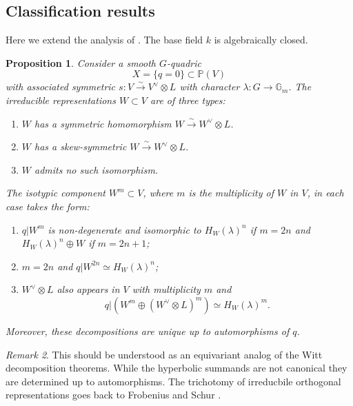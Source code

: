 \documentclass[12pt]{amsart}
\numberwithin{equation}{section}
\newcommand{\lra}{\longrightarrow}
\newcommand{\ra}{\rightarrow}
\newcommand{\bG}{\mathbb{G}}
\newcommand{\bP}{\mathbb{P}}
\theoremstyle{plain}
\newtheorem{prop}{Proposition}[section]
\theoremstyle{definition}
\theoremstyle{remark}
\newtheorem{rema}[prop]{Remark}
\begin{document}
\subsection*{Classification results}
Here we extend the analysis of \cite[\S 3]{HTEGLDQ}.
The base field $k$ is algebraically closed.  
\begin{prop} \label{prop:decomp}
Consider a smooth $G$-quadric
$$X=\{q=0 \} \subset \bP(V)$$
with associated symmetric
$s:V \stackrel{\sim}{\lra} V^{\vee} \otimes L$
with character $\lambda: G \ra \bG_m$.  
The irreducible representations $W \subset V$ are 
of three types:
\begin{enumerate}
\item{$W$ has a symmetric homomorphism
$W\stackrel{\sim}{\rightarrow} W^{\vee} \otimes L$.}
\item{$W$ has a skew-symmetric
$W\stackrel{\sim}{\rightarrow} W^{\vee} \otimes L$.}
\item{$W$ admits no such isomorphism.}
\end{enumerate}
The isotypic component $W^m \subset V$, where
$m$ is the multiplicity of $W$ in $V$, 
in each case takes the form:
\begin{enumerate}
\item{$q|W^m$ is non-degenerate and isomorphic to
$H_W(\lambda)^n$ if $m=2n$ and $H_W(\lambda)^n \oplus W$
if $m=2n+1$;}
\item{$m=2n$ and $q|W^{2n} \simeq H_W(\lambda)^n$;}
\item{$W^{\vee}\otimes L$ also appears in $V$ with 
multiplicity $m$ and
$$q|(W^m \oplus (W^{\vee}\otimes L)^m) \simeq 
H_W(\lambda)^m.$$}
\end{enumerate}
Moreover, these decompositions are unique up to 
automorphisms of $q$.  
\end{prop}
\begin{rema}
This should be understood as an equivariant 
analog of the Witt decomposition theorems. 
While the hyperbolic summands are not canonical they
are determined up to automorphisms.
The trichotomy of irreducbile orthogonal representations goes back to Frobenius and Schur \cite[p.~58]{Isaacs}.  
\end{rema}
\end{document}

